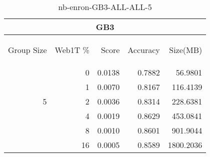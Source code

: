 \begin{center}
\begin{table}[htbp] 
 \begin{center}
\begin{tabular}{ | r | r | r | r | r |}
\hline
\multicolumn{5}{|c|}{GB3}\\
\hline
\begin{sideways}Group Size\end{sideways} & \begin{sideways}Web1T \%\end{sideways} & \begin{sideways}Score\end{sideways} & \begin{sideways}Accuracy\end{sideways} & \begin{sideways}Size(MB)\end{sideways}\\
\hline
\multirow{5}{*}{5}
 & 0 & 0.0138 & 0.7882 & 56.9801\\ \cline{2-5}
 & 1 & 0.0070 & 0.8167 & 116.4139\\ \cline{2-5}
 & 2 & 0.0036 & 0.8314 & 228.6381\\ \cline{2-5}
 & 4 & 0.0019 & 0.8629 & 453.0841\\ \cline{2-5}
 & 8 & 0.0010 & 0.8601 & 901.9044\\ \cline{2-5}
 & 16 & 0.0005 & 0.8589 & 1800.2036\\ \cline{2-5}
\hline
\end{tabular}
\caption{nb-enron-GB3-ALL-ALL-5}
\label{table:nb-enron-GB3-ALL-ALL-5}
\end{center}
 \end{table}
\end{center}

